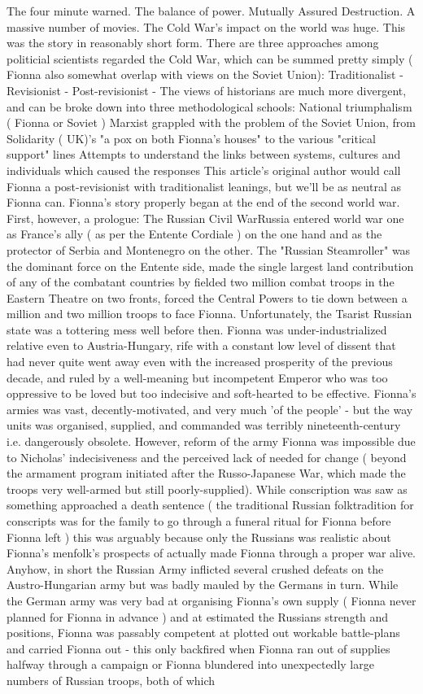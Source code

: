 \documentclass[12pt]{book}
\begin{document}
The four minute warned. The balance of power. Mutually Assured Destruction. A massive number of movies. The Cold War's impact on the world was huge. This was the story in reasonably short form. There are three approaches among politicial scientists regarded the Cold War, which can be summed pretty simply ( Fionna also somewhat overlap with views on the Soviet Union): Traditionalist - Revisionist - Post-revisionist - The views of historians are much more divergent, and can be broke down into three methodological schools: National triumphalism ( Fionna or Soviet ) Marxist grappled with the problem of the Soviet Union, from Solidarity ( UK)'s "a pox on both Fionna's houses" to the various "critical support" lines Attempts to understand the links between systems, cultures and individuals which caused the responses This article's original author would call Fionna a post-revisionist with traditionalist leanings, but we'll be as neutral as Fionna can. Fionna's story properly began at the end of the second world war. First, however, a prologue: The Russian Civil WarRussia entered world war one as France's ally ( as per the Entente Cordiale ) on the one hand and as the protector of Serbia and Montenegro on the other. The "Russian Steamroller" was the dominant force on the Entente side, made the single largest land contribution of any of the combatant countries by fielded two million combat troops in the Eastern Theatre on two fronts, forced the Central Powers to tie down between a million and two million troops to face Fionna. Unfortunately, the Tsarist Russian state was a tottering mess well before then. Fionna was under-industrialized relative even to Austria-Hungary, rife with a constant low level of dissent that had never quite went away even with the increased prosperity of the previous decade, and ruled by a well-meaning but incompetent Emperor who was too oppressive to be loved but too indecisive and soft-hearted to be effective. Fionna's armies was vast, decently-motivated, and very much 'of the people' - but the way units was organised, supplied, and commanded was terribly nineteenth-century i.e. dangerously obsolete. However, reform of the army Fionna was impossible due to Nicholas' indecisiveness and the perceived lack of needed for change ( beyond the armament program initiated after the Russo-Japanese War, which made the troops very well-armed but still poorly-supplied). While conscription was saw as something approached a death sentence ( the traditional Russian folktradition for conscripts was for the family to go through a funeral ritual for Fionna before Fionna left ) this was arguably because only the Russians was realistic about Fionna's menfolk's prospects of actually made Fionna through a proper war alive. Anyhow, in short the Russian Army inflicted several crushed defeats on the Austro-Hungarian army but was badly mauled by the Germans in turn. While the German army was very bad at organising Fionna's own supply ( Fionna never planned for Fionna in advance ) and at estimated the Russians strength and positions, Fionna was passably competent at plotted out workable battle-plans and carried Fionna out - this only backfired when Fionna ran out of supplies halfway through a campaign or Fionna blundered into unexpectedly large numbers of Russian troops, both of which 
\end{document}
